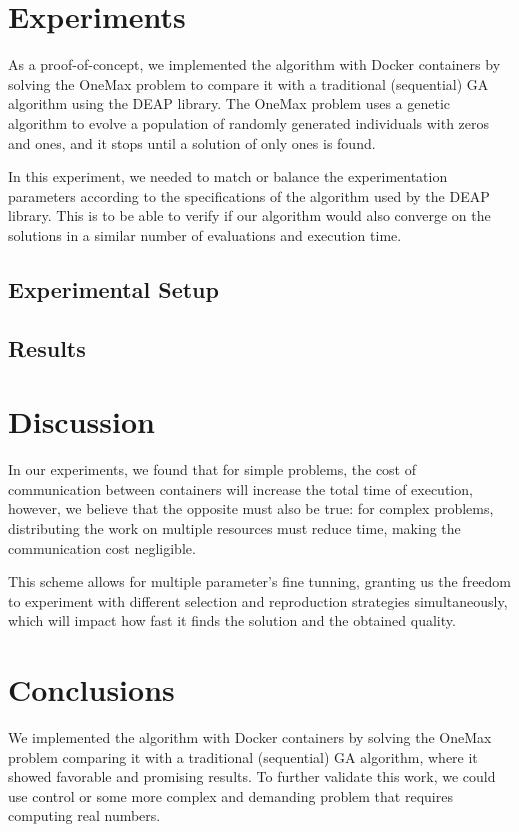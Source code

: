 \documentclass[runningheads]{llncs}
\begin{document}
\section{Experiments} 

As a proof-of-concept, we implemented the algorithm with Docker containers by
solving the OneMax problem to compare it with a traditional (sequential) GA
algorithm using the DEAP library. The OneMax problem uses a genetic algorithm
to evolve a population of randomly generated individuals with zeros and ones,
and it stops until a solution of only ones is found.

In this experiment, we needed to match or balance the experimentation
parameters according to the specifications of the algorithm used by the DEAP
library. This is to be able to verify if our algorithm would also converge on
the solutions in a similar number of evaluations and execution time.

\subsection{Experimental Setup}

\subsection{Results}


\section{Discussion}

In our experiments, we found that for simple problems, the cost of
communication between containers will increase the total time of execution,
however, we believe that the opposite must also be true: for complex problems,
distributing the work on multiple resources must reduce time, making the
communication cost negligible.

This scheme allows for multiple parameter's fine tunning, granting us the
freedom to experiment with different selection and reproduction strategies
simultaneously, which will impact how fast it finds the solution and the
obtained quality.

\section{Conclusions}

We implemented the algorithm with Docker containers by solving the OneMax
problem comparing it with a traditional (sequential) GA algorithm, where it
showed favorable and promising results. To further validate this work, we could
use control or some more complex and demanding problem that requires computing
real numbers.
\end{document}
